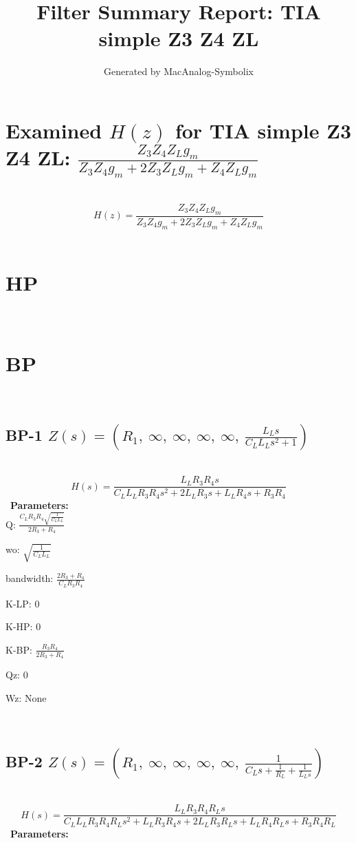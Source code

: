 \documentclass{article}
\begin{document}
        
                        \title{Filter Summary Report: TIA simple Z3 Z4 ZL}
                        \author{Generated by MacAnalog-Symbolix}
                        \maketitle

                        \tableofcontents
                        \newpage
                        \section{Examined $H(z)$ for TIA simple Z3 Z4 ZL: $\frac{Z_{3} Z_{4} Z_{L} g_{m}}{Z_{3} Z_{4} g_{m} + 2 Z_{3} Z_{L} g_{m} + Z_{4} Z_{L} g_{m}}$ }\ 
\textbf{\[H(z) = \frac{Z_{3} Z_{4} Z_{L} g_{m}}{Z_{3} Z_{4} g_{m} + 2 Z_{3} Z_{L} g_{m} + Z_{4} Z_{L} g_{m}}\] }\ 
\section{HP}\ 
\section{BP}\ 
\subsection{BP-1 $Z(s) = \left( R_{1}, \  \infty, \  \infty, \  \infty, \  \infty, \  \frac{L_{L} s}{C_{L} L_{L} s^{2} + 1}\right)$ } \ 
\textbf{\[H(s) = \frac{L_{L} R_{3} R_{4} s}{C_{L} L_{L} R_{3} R_{4} s^{2} + 2 L_{L} R_{3} s + L_{L} R_{4} s + R_{3} R_{4}}\] } \ 
\textbf{Parameters:}\\ 

Q: $\frac{C_{L} R_{3} R_{4} \sqrt{\frac{1}{C_{L} L_{L}}}}{2 R_{3} + R_{4}}$\ 

wo: $\sqrt{\frac{1}{C_{L} L_{L}}}$\ 

bandwidth: $\frac{2 R_{3} + R_{4}}{C_{L} R_{3} R_{4}}$\ 

K-LP: $0$\ 

K-HP: $0$\ 

K-BP: $\frac{R_{3} R_{4}}{2 R_{3} + R_{4}}$\ 

Qz: $0$\ 

Wz: $\text{None}$\ 

\ 

\subsection{BP-2 $Z(s) = \left( R_{1}, \  \infty, \  \infty, \  \infty, \  \infty, \  \frac{1}{C_{L} s + \frac{1}{R_{L}} + \frac{1}{L_{L} s}}\right)$ } \ 
\textbf{\[H(s) = \frac{L_{L} R_{3} R_{4} R_{L} s}{C_{L} L_{L} R_{3} R_{4} R_{L} s^{2} + L_{L} R_{3} R_{4} s + 2 L_{L} R_{3} R_{L} s + L_{L} R_{4} R_{L} s + R_{3} R_{4} R_{L}}\] } \ 
\textbf{Parameters:}\\ 
\end{document}
